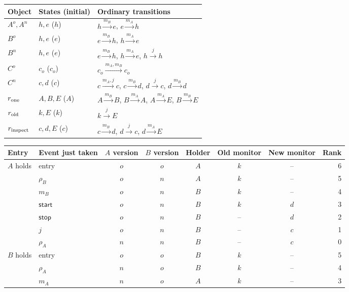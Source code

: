 \begin{figure}[!htbp]
\centering
{\footnotesize
\begin{tabular}{@{}p{.16\linewidth}p{.20\linewidth}p{.58\linewidth}@{}}\toprule
Object & States (initial) & Ordinary transitions\\\midrule
$A^o,A^n$ & $h,e$ ($h$) & $h\xrightarrow{m_B}e$, $e\xrightarrow{m_A}h$\\
$B^o$ & $h,e$ ($e$) & $e\xrightarrow{m_B}h$, $h\xrightarrow{m_A}e$\\
$B^n$ & $h,e$ ($e$) & $e\xrightarrow{m_B}h$, $h\xrightarrow{m_A}e$, $h\xrightarrow{j}h$\\
$C^o$ & $c_o$ ($c_o$) & $c_o\xrightarrow{m_A,m_B}c_o$\\
$C^n$ & $c,d$ ($c$) & $c\xrightarrow{m_A,j}c$, $c\xrightarrow{m_B}d$, $d\xrightarrow{j}c$, $d\xrightarrow{m_B}d$\\\midrule
$r_{\rm one}$ & $A,B,E$ ($A$) & $A\xrightarrow{m_B}B$, $B\xrightarrow{m_A}A$, $A\xrightarrow{m_A}E$, $B\xrightarrow{m_B}E$\\
$r_{\rm old}$ & $k,E$ ($k$) & $k\xrightarrow{j}E$\\
$r_{\rm inspect}$ & $c,d,E$ ($c$) & $c\xrightarrow{m_B}d$, $d\xrightarrow{j}c$, $d\xrightarrow{m_A}E$\\\bottomrule
\end{tabular}
\par\smallskip
\begin{tabular}{@{}llcccccr@{}}\toprule
Entry & Event just taken & $A$ version & $B$ version & Holder & Old monitor & New monitor & Rank\\\midrule
$A$ holds & entry & $o$ & $o$ & $A$ & $k$ & -- & 6\\
& $\rho_B$ & $o$ & $n$ & $A$ & $k$ & -- & 5\\
& $m_B$ & $o$ & $n$ & $B$ & $k$ & -- & 4\\
& $\mathsf{start}$ & $o$ & $n$ & $B$ & $k$ & $d$ & 3\\
& $\mathsf{stop}$ & $o$ & $n$ & $B$ & -- & $d$ & 2\\
& $j$ & $o$ & $n$ & $B$ & -- & $c$ & 1\\
& $\rho_A$ & $n$ & $n$ & $B$ & -- & $c$ & 0\\\midrule
$B$ holds & entry & $o$ & $o$ & $B$ & $k$ & -- & 5\\
& $\rho_A$ & $n$ & $o$ & $B$ & $k$ & -- & 4\\
& $m_A$ & $n$ & $o$ & $A$ & $k$ & -- & 3\\

\end{tabular}}
\end{figure}
